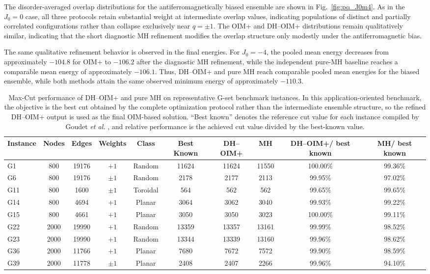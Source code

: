 \documentclass[
reprint,
amsmath,amssymb,
aps,
pre,
floatfix,
]{revtex4-2}
\begin{document}
The disorder-averaged overlap distributions for the antiferromagnetically
biased ensemble are shown in Fig.~\ref{fig:pq_J0m4}. As in the $J_0=0$
case, all three protocols retain substantial weight at intermediate
overlap values, indicating populations of distinct and partially
correlated configurations rather than collapse exclusively near
$q=\pm1$. The OIM+ and DH--OIM+ distributions remain qualitatively
similar, indicating that the short diagnostic MH refinement modifies the
overlap structure only modestly under the antiferromagnetic bias.

The same qualitative refinement behavior is observed in the final
energies. For $J_0=-4$, the pooled mean energy decreases from
approximately $-104.8$ for OIM+ to $-106.2$ after the diagnostic MH
refinement, while the independent pure-MH baseline reaches a comparable
mean energy of approximately $-106.1$. Thus, DH--OIM+ and pure MH reach comparable pooled mean energies for the
biased ensemble, while both methods attain the same observed minimum energy
of approximately $-110.3$.

\begin{table}[t]
\caption{
Max-Cut performance of DH--OIM+ and pure MH on representative G-set
benchmark instances. In this application-oriented benchmark, the objective
is the best cut obtained by the complete optimization protocol rather than
the intermediate ensemble structure, so the refined DH--OIM+ output is used
as the final OIM-based solution. ``Best known'' denotes the reference cut
value for each instance compiled by Goudet
\emph{et al.} \cite{Goudet2024}, and relative performance is the achieved cut value
divided by the best-known value.
}
\label{tab:gset_results}
\begin{ruledtabular}
\begin{tabular}{lccccccccc}
Instance &
Nodes &
Edges &
Weights &
Class &
Best Known&
DH--OIM+&
MH&
DH--OIM+/ best known&
MH/ best known
\\
\hline
G1  & 800  & 19176 & $+1$     & Random   & 11624 & 11624 & 11550 & 100.00\% & 99.36\% \\
G6  & 800  & 19176 & $\pm1$   & Random   & 2178  & 2177  & 2113  & 99.95\% & 97.02\% \\
G11 & 800  & 1600  & $\pm1$   & Toroidal & 564   & 562   & 562   & 99.65\% & 99.65\% \\
G14 & 800  & 4694  & $+1$     & Planar   & 3064  & 3062  & 3040  & 99.93\% & 99.22\% \\
G15 & 800  & 4661  & $+1$     & Planar   & 3050  & 3050  & 3023  & 100.00\% & 99.11\% \\
G22 & 2000 & 19990 & $+1$     & Random   & 13359 & 13357 & 13161 & 99.99\% & 98.52\% \\
G23 & 2000 & 19990 & $+1$     & Random   & 13344 & 13339 & 13160 & 99.96\% & 98.62\% \\
G36 & 2000 & 11766 & $+1$     & Planar   & 7680  & 7672  & 7572 & 99.90\% & 98.59\% \\
G39 & 2000 & 11778 & $\pm1$   & Planar   & 2408  & 2407  & 2266 & 99.96\% & 94.10\% \\
\end{tabular}
\end{ruledtabular}
\end{table}
\end{document}
